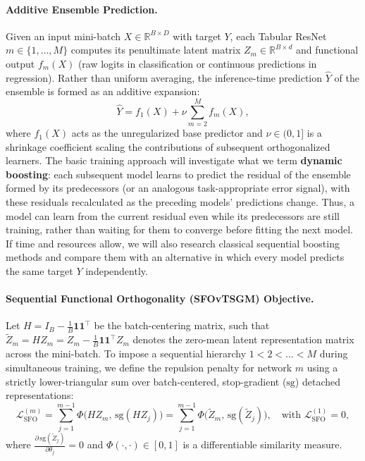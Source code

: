 \documentclass[11pt, a4paper]{article}
\begin{document}
\paragraph{Additive Ensemble Prediction.}
Given an input mini-batch $X \in \mathbb{R}^{B \times D}$ with target $Y$, each Tabular ResNet $m \in \{1, \dots, M\}$ computes its penultimate latent matrix $Z_m \in \mathbb{R}^{B \times d}$ and functional output $f_m(X)$ (raw logits in classification or continuous predictions in regression). Rather than uniform averaging, the inference-time prediction $\hat{Y}$ of the ensemble is formed as an additive expansion:
\begin{equation}
    \hat{Y} = f_1(X) + \nu \sum_{m=2}^{M} f_m(X),
\end{equation}
where $f_1(X)$ acts as the unregularized base predictor and $\nu \in (0, 1]$ is a shrinkage coefficient scaling the contributions of subsequent orthogonalized learners. The basic training approach will investigate what we term \textbf{dynamic boosting}: each subsequent model learns to predict the residual of the ensemble formed by its predecessors (or an analogous task-appropriate error signal), with these residuals recalculated as the preceding models' predictions change. Thus, a model can learn from the current residual even while its predecessors are still training, rather than waiting for them to converge before fitting the next model. If time and resources allow, we will also research classical sequential boosting methods and compare them with an alternative in which every model predicts the same target $Y$ independently.

\paragraph{Sequential Functional Orthogonality (SFOvTSGM) Objective.}
Let $H = I_B - \frac{1}{B}\mathbf{1}\mathbf{1}^\top$ be the batch-centering matrix, such that $\tilde{Z}_m = H Z_m = Z_m - \frac{1}{B}\mathbf{1}\mathbf{1}^\top Z_m$ denotes the zero-mean latent representation matrix across the mini-batch. To impose a sequential hierarchy $1 < 2 < \dots < M$ during simultaneous training, we define the repulsion penalty for network $m$ using a strictly lower-triangular sum over batch-centered, stop-gradient ($\text{sg}$) detached representations:
\begin{equation}
    \mathcal{L}_{\text{SFO}}^{(m)} = \sum_{j=1}^{m-1} \Phi\Big(H Z_m, \, \text{sg}(H Z_j)\Big) = \sum_{j=1}^{m-1} \Phi\Big(\tilde{Z}_m, \, \text{sg}(\tilde{Z}_j)\Big), \quad \text{with } \mathcal{L}_{\text{SFO}}^{(1)} = 0,
\end{equation}
where $\frac{\partial \, \text{sg}(\tilde{Z}_j)}{\partial \theta_j} = 0$ and $\Phi(\cdot, \cdot) \in [0, 1]$ is a differentiable similarity measure.
\end{document}

